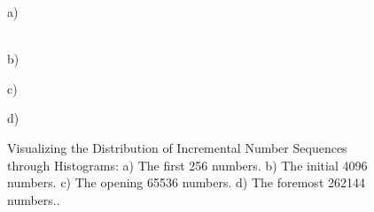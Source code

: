 \documentclass[12pt]{article}
\begin{document}
	   		\begin{figure}
	   			\begin{minipage}[h]{0.99\linewidth}
	   				 a) \\
	   			\end{minipage}
	   			\vfill
	   			\begin{minipage}[h]{0.99\linewidth}
	   				 \\b)
	   			\end{minipage}
	   			\vfill
	   			\begin{minipage}[h]{0.99\linewidth}
	   				 c) \\
	   			\end{minipage}
	   			\vfill
	   			\begin{minipage}[h]{0.99\linewidth}
	   				 d) \\
	   			\end{minipage}
	   			\caption{ Visualizing the Distribution of Incremental Number Sequences through Histograms: a) The first 256 numbers. b)
	   				The initial 4096 numbers. c) The opening 65536 numbers. d) The foremost 262144 numbers..}
	   			\label{ris:experimentalcorrelationsignals}
	   		\end{figure}
\end{document}
